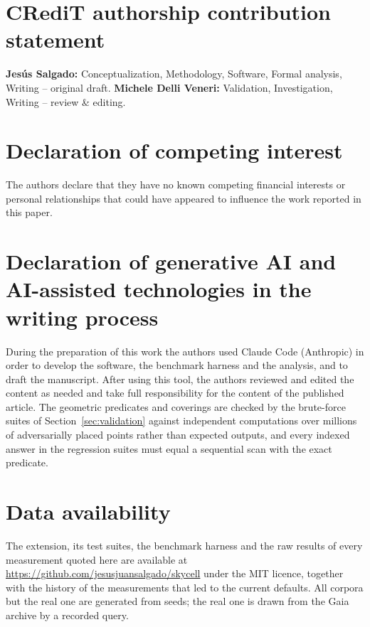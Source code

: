 \documentclass[final,5p,times,twocolumn,authoryear]{elsarticle}
\begin{document}
\section*{CRediT authorship contribution statement}

\textbf{Jes\'us Salgado:} Conceptualization, Methodology, Software, Formal analysis,
Writing -- original draft. \textbf{Michele Delli Veneri:} Validation, Investigation,
Writing -- review \& editing.

\section*{Declaration of competing interest}

The authors declare that they have no known competing financial interests or personal
relationships that could have appeared to influence the work reported in this paper.

\section*{Declaration of generative AI and AI-assisted technologies in the writing process}

During the preparation of this work the authors used Claude Code (Anthropic) in order to
develop the software, the benchmark harness and the analysis, and to draft the
manuscript. After using this tool, the authors reviewed and edited the content as needed
and take full responsibility for the content of the published article. The geometric
predicates and coverings are checked by the brute-force suites of
Section~\ref{sec:validation} against independent computations over millions of
adversarially placed points rather than expected outputs, and every indexed answer in the
regression suites must equal a sequential scan with the exact predicate.

\section*{Data availability}

The extension, its test suites, the benchmark harness and the raw results of every
measurement quoted here are available at
\url{https://github.com/jesusjuansalgado/skycell} under the MIT licence, together with
the history of the measurements that led to the current defaults. All corpora but the
real one are generated from seeds; the real one is drawn from the Gaia archive by a
recorded query.
\end{document}
